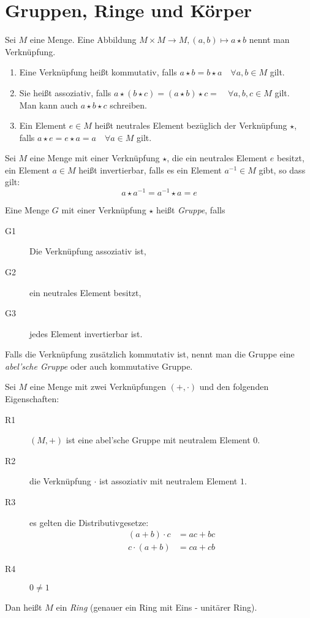 \chapter{Gruppen, Ringe und Körper}
Sei $M$ eine Menge. Eine Abbildung $M\times M \rightarrow M, (a,b)\mapsto a\star b$ nennt man Verknüpfung.

\begin{enumerate}
  \item Eine Verknüpfung heißt kommutativ, falls $a\star b = b\star a \quad\forall a,b\in M$ gilt.
  \item Sie heißt assoziativ, falls $a\star(b\star c)=(a\star b)\star c = \quad\forall a,b,c\in M$ gilt.\\
  Man kann auch $a\star b\star c$ schreiben.
  \item Ein Element $e\in M$ heißt neutrales Element bezüglich der Verknüpfung $\star$,\\
  falls $a\star e = e\star a=a \quad\forall a\in M$ gilt.
\end{enumerate}

Sei $M$ eine Menge mit einer Verknüpfung $\star$, die ein neutrales Element $e$ besitzt, ein Element $a\in M$ heißt invertierbar, falls es ein Element $a^{-1}\in M$ gibt, so dass gilt:
\begin{equation*}
  a\star a^{-1} = a^{-1} \star a = e
\end{equation*}

Eine Menge $G$ mit einer Verknüpfung $\star$ heißt \emph{Gruppe}, falls
\begin{description}
  \item[G1] Die Verknüpfung assoziativ ist,\label{gruppe1}
  \item[G2] ein neutrales Element besitzt,
  \item[G3] jedes Element invertierbar ist.\label{gruppe3}
\end{description}
Falls die Verknüpfung zusätzlich kommutativ ist, nennt man die Gruppe eine \emph{abel'sche Gruppe} oder auch kommutative Gruppe.

Sei $M$ eine Menge mit zwei Verknüpfungen $(+,\cdot)$ und den folgenden Eigenschaften:
\begin{description}
  \item[R1] $(M,+)$ ist eine abel'sche Gruppe mit neutralem Element $0$.
  \item[R2] die Verknüpfung $\cdot$ ist assoziativ mit neutralem Element $1$.
  \item[R3] es gelten die Distributivgesetze:
  \begin{align*}
    (a+b)\cdot c&=ac+bc\\
    c\cdot(a+b)&=ca+cb
  \end{align*}
  \item[R4] $0\neq 1$
\end{description}
Dan heißt $M$ ein \emph{Ring} (genauer ein Ring mit Eins - unitärer Ring).

